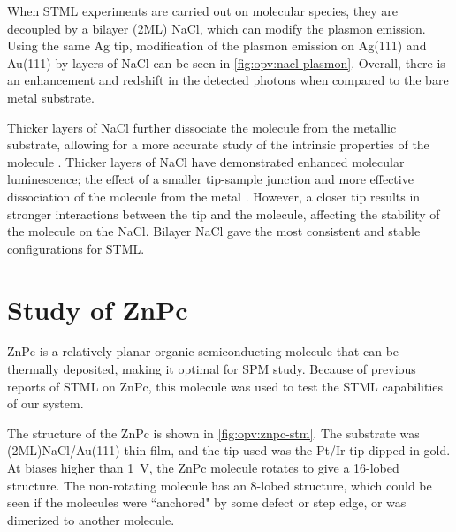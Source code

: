 \begin{figure} [h]
    \centering
    \caption{}
    \label{fig:opv:metal-plasmon}
\end{figure}



When \ac{STML} experiments are carried out on molecular species, they are decoupled by a bilayer (2\ac{ML}) NaCl, which can modify the plasmon emission. Using the same Ag tip, modification of the plasmon emission on Ag(111) and Au(111) by layers of NaCl can be seen in \autoref{fig:opv:nacl-plasmon}. Overall, there is an enhancement and redshift in the detected photons when compared to the bare metal substrate.


\begin{figure} [h]
    \centering
    \caption{}
    \label{fig:opv:nacl-plasmon}
\end{figure}

Thicker layers of NaCl further dissociate the molecule from the metallic substrate, allowing for a more accurate study of the intrinsic properties of the molecule \citep{repp2005molecules}. Thicker layers of NaCl have demonstrated enhanced molecular luminescence; the effect of a smaller tip-sample junction and more effective dissociation of the molecule from the metal \citep{Zhang2017,Kroger2018}. However, a closer tip results in stronger interactions between the tip and the molecule, affecting the stability of the molecule on the NaCl. Bilayer NaCl gave the most consistent and stable configurations for \ac{STML}.



\section{Study of {ZnPc}}

\ac{ZnPc} is a relatively planar organic semiconducting molecule that can be thermally deposited, making it optimal for \ac{SPM} study. Because of previous reports of \ac{STML} on ZnPc, this molecule was used to test the \ac{STML} capabilities of our system. 

The structure of the ZnPc is shown in \autoref{fig:opv:znpc-stm}. The substrate was (2ML)NaCl/Au(111) thin film, and the tip used was the Pt/Ir tip dipped in gold. At biases higher than \SI{1}{V}, the ZnPc molecule rotates to give a 16-lobed structure. The non-rotating molecule has an 8-lobed structure, which could be seen if the molecules were ``anchored" by some defect or step edge, or was dimerized to another molecule.  

